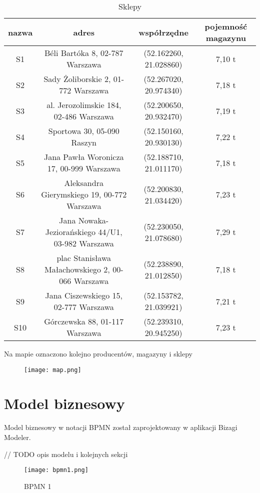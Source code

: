 \documentclass{article}
\begin{document}
\begin{center}
\begin{longtable}{|c c c c|} 
\caption{Sklepy} \\
\hline
nazwa & adres & współrzędne & pojemność magazynu \\
\hline \hline
S1 & Béli Bartóka 8, 02-787 Warszawa & (52.162260, 21.028860) & 7,10 t \\
\hline S2 & Sady Żoliborskie 2, 01-772 Warszawa & (52.267020, 20.974340) & 7,18 t \\
\hline S3 & al. Jerozolimskie 184, 02-486 Warszawa & (52.200650, 20.932470) & 7,19 t \\
\hline S4 & Sportowa 30, 05-090 Raszyn & (52.150160, 20.930130) & 7,22 t \\
\hline S5 & Jana Pawła Woronicza 17, 00-999 Warszawa & (52.188710, 21.011170) & 7,18 t \\
\hline S6 & Aleksandra Gierymskiego 19, 00-772 Warszawa & (52.200830, 21.034420) & 7,23 t \\
\hline S7 & Jana Nowaka-Jeziorańskiego 44/U1, 03-982 Warszawa & (52.230050, 21.078680) & 7,29 t \\
\hline S8 & plac Stanisława Małachowskiego 2, 00-066 Warszawa & (52.238890, 21.012850) & 7,18 t \\
\hline S9 & Jana Ciszewskiego 15, 02-777 Warszawa & (52.153782, 21.039921) & 7,21 t \\
\hline S10 & Górczewska 88, 01-117 Warszawa & (52.239310, 20.945250) & 7,23 t \\
\hline
\end{longtable}
\end{center}

Na mapie oznaczono kolejno {\color{blue} producentów}, {\color{violet} magazyny} i {\color{red} sklepy}

\begin{figure}[H]
\centering
\texttt{[image: map.png]}
\end{figure}

\section{Model biznesowy}

Model biznesowy w notacji BPMN został zaprojektowany w aplikacji Bizagi Modeler.

// TODO opis modelu i kolejnych sekcji

\begin{figure}[H]
\caption{BPMN 1}
\centering
\texttt{[image: bpmn1.png]}
\end{figure}
\end{document}
